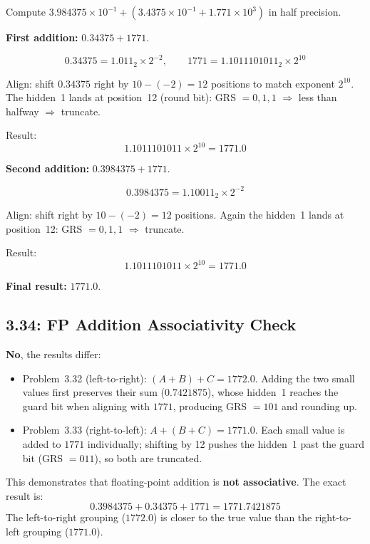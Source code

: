Compute $3.984375 \times 10^{-1} + (3.4375 \times 10^{-1} + 1.771 \times 10^{3})$
in half precision.

\noindent\textbf{First addition:} $0.34375 + 1771$.

\[
  0.34375 = 1.011_2 \times 2^{-2},\qquad
  1771 = 1.1011101011_2 \times 2^{10}
\]

Align: shift $0.34375$ right by $10 - (-2) = 12$ positions to match exponent
$2^{10}$. The hidden~1 lands at position~12 (round bit):
GRS $= 0,1,1$ $\Rightarrow$ less than halfway $\Rightarrow$ truncate.

Result:
\[
  1.1011101011 \times 2^{10} = 1771.0
\]

\noindent\textbf{Second addition:} $0.3984375 + 1771$.

\[
  0.3984375 = 1.10011_2 \times 2^{-2}
\]

Align: shift right by $10 - (-2) = 12$ positions. Again the hidden~1 lands at
position~12: GRS $= 0,1,1$ $\Rightarrow$ truncate.

Result:
\[
  1.1011101011 \times 2^{10} = 1771.0
\]

\noindent\textbf{Final result:} $\mathbf{1771.0}$.

\subsection*{3.34: FP Addition Associativity Check}
\hypertarget{sol-3.34}{}

\textbf{No}, the results differ:
\begin{itemize}
  \item Problem~3.32 (left-to-right): $(A + B) + C = \mathbf{1772.0}$.
        Adding the two small values first preserves their sum ($0.7421875$),
        whose hidden~1 reaches the guard bit when aligning with $1771$,
        producing GRS $= 101$ and rounding up.
  \item Problem~3.33 (right-to-left): $A + (B + C) = \mathbf{1771.0}$.
        Each small value is added to $1771$ individually; shifting by 12
        pushes the hidden~1 past the guard bit (GRS $= 011$), so both are
        truncated.
\end{itemize}

This demonstrates that floating-point addition is \textbf{not associative}.
The exact result is:
\[
  0.3984375 + 0.34375 + 1771 = 1771.7421875
\]
The left-to-right grouping ($1772.0$) is closer to the true value than the
right-to-left grouping ($1771.0$).
